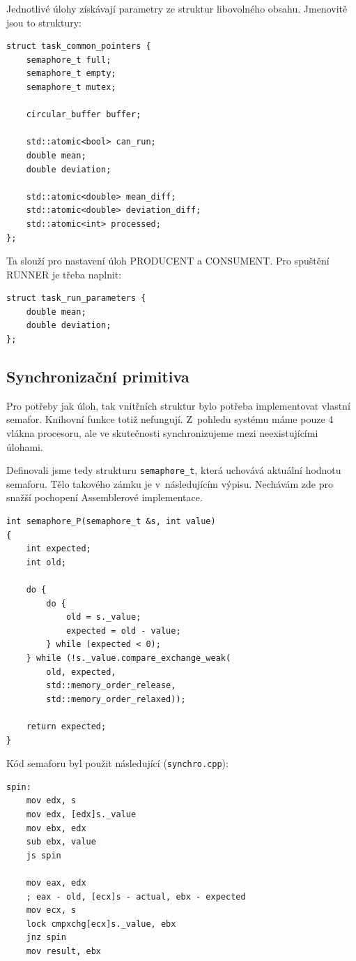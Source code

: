 \documentclass[a4paper,12pt]{article}
\begin{document}
Jednotlivé úlohy získávají parametry ze struktur libovolného obsahu. Jmenovitě
jsou to struktury:

\begin{lstlisting}
struct task_common_pointers {
	semaphore_t full;
	semaphore_t empty;
	semaphore_t mutex;

	circular_buffer buffer;

	std::atomic<bool> can_run;
	double mean;
	double deviation;

	std::atomic<double> mean_diff;
	std::atomic<double> deviation_diff;
	std::atomic<int> processed;
};
\end{lstlisting}

Ta slouží pro nastavení úloh PRODUCENT a CONSUMENT. Pro spuštění RUNNER je třeba naplnit:

\begin{lstlisting}
struct task_run_parameters {
	double mean;
	double deviation;
};
\end{lstlisting}

\subsection{Synchronizační primitiva}
Pro potřeby jak úloh, tak vnitřních struktur bylo potřeba implementovat vlastní
semafor. Knihovní funkce totiž nefungují. Z~pohledu systému máme pouze 4 vlákna
procesoru, ale ve skutečnosti synchronizujeme mezi neexistujícími úlohami.

Definovali jsme tedy strukturu \texttt{semaphore\_t}, která uchovává aktuální hodnotu
semaforu. Tělo takového zámku je v~následujícím výpisu. Nechávám zde pro snažší
pochopení Assemblerové implementace.

\begin{lstlisting}
int semaphore_P(semaphore_t &s, int value)
{
	int expected;
	int old;

	do {
		do {
			old = s._value;
			expected = old - value;
		} while (expected < 0);
	} while (!s._value.compare_exchange_weak(
		old, expected,
		std::memory_order_release,
		std::memory_order_relaxed));

	return expected;
}
\end{lstlisting}

Kód semaforu byl použit následující (\texttt{synchro.cpp}):


\begin{lstlisting}
spin:
	mov edx, s
	mov edx, [edx]s._value
	mov ebx, edx
	sub ebx, value
	js spin

	mov eax, edx
	; eax - old, [ecx]s - actual, ebx - expected
	mov ecx, s
	lock cmpxchg[ecx]s._value, ebx
	jnz spin
	mov result, ebx
\end{lstlisting}
\end{document}
